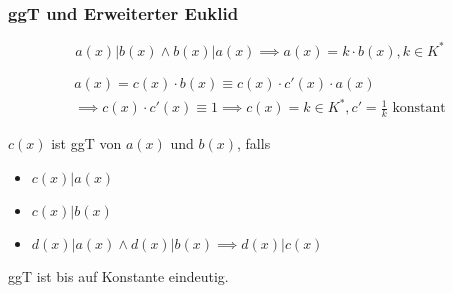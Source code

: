 \subsubsection{ggT und Erweiterter Euklid}
\[ a(x) | b(x) \wedge b(x) | a(x) \implies a(x) = k \cdot b(x) , k \in K^* \]
\begin{bew}
	\begin{gather*}
		a(x) = c(x) \cdot b(x) \equiv c(x) \cdot c'(x) \cdot a(x) \\
		\implies c(x) \cdot c'(x) \equiv 1 \implies c(x) = k \in K^* , c' = \frac{1}{k} \text{ konstant}
	\end{gather*}
\end{bew}
\begin{def*}[note = ggT , index = ggT]
	$c(x)$ ist ggT von $a(x)$ und $b(x)$, falls 
	\begin{itemize}
		\item $c(x) | a(x)$
		\item $c(x) | b(x)$
		\item $d(x) | a(x) \wedge d(x) | b(x) \implies d(x) | c(x)$
	\end{itemize}
	ggT ist bis auf Konstante eindeutig.
\end{def*}

